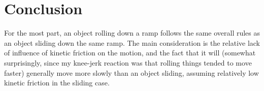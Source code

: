 \section{Conclusion}

For the most part, an object rolling down a ramp follows the same overall rules as an object sliding down the same ramp.
The main consideration is the relative lack of influence of kinetic friction on the motion, and the fact that it will (somewhat surprisingly, since my knee-jerk reaction was that rolling things tended to move faster) generally
move more slowly than an object sliding, assuming relatively low kinetic friction in the sliding case.

